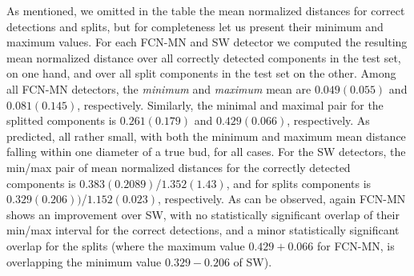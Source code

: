 \documentclass[a4paper,authoryear,review]{elsarticle}
\begin{document}
	As mentioned, we omitted in the table the mean normalized distances for correct detections and splits, but for completeness let us present their minimum and maximum values.
	For each FCN-MN and SW detector we computed the resulting mean normalized distance over all correctly detected components in the test set, on one hand, and over all split components in the test set on the other. 
	Among all FCN-MN detectors, the \emph{minimum} and  \emph{maximum} mean are $0.049(0.055)$ and $0.081(0.145)$, respectively. Similarly, the minimal and maximal pair for the splitted components is $0.261(0.179)$ and $0.429(0.066)$, respectively. As predicted, all rather small, with both the minimum and maximum mean distance falling within one diameter of a true bud, for all cases.
	For the SW detectors, the min/max pair of mean normalized distances for the correctly detected components is $0.383(0.2089)$/$1.352(1.43)$, and for splits components is $0.329(0.206))$/$1.152(0.023)$, respectively. As can be observed, again FCN-MN shows an improvement over SW, with no statistically significant overlap of their min/max interval for the correct detections, and a minor statistically significant overlap for the splits (where the maximum value $0.429 + 0.066$ for FCN-MN,  is overlapping the minimum value $0.329-0.206$ of SW).
	
	
	
	
	
	
	
	
	
	
	
\end{document}
